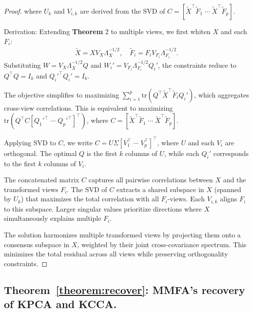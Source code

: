 \begin{proof}


where \( U_k \) and \( V_{i,k} \) are derived from the SVD of \( C = [\tilde{X}^\top \tilde{F}_1 \; \cdots \; \tilde{X}^\top \tilde{F}_p] \).

Derivation:  
Extending \textbf{Theorem} 2 to multiple views, we first whiten \( X \) and each \( F_i \):  
\begin{equation}
\begin{aligned}
\tilde{X} = X V_X\Lambda_X^{-1/2}, \quad \tilde{F}_i = F_i V_{F_i}\Lambda_{F_i}^{-1/2}.
\end{aligned}
\end{equation} 
Substituting \( W = V_X\Lambda_X^{-1/2} Q \) and \( W_i' = V_{F_i}\Lambda_{F_i}^{-1/2} Q_i' \), the constraints reduce to \( Q^\top Q = I_k \) and \( Q_i'^\top Q_i' = I_k \).  

The objective simplifies to maximizing \( \sum_{i=1}^p \text{tr}(Q^\top \tilde{X}^\top \tilde{F}_i Q_i') \), which aggregates cross-view correlations. This is equivalent to maximizing \( \text{tr}(Q^\top C [Q_1'^\top \; \cdots \; Q_p'^\top]^\top) \), where \( C = [\tilde{X}^\top \tilde{F}_1 \; \cdots \; \tilde{X}^\top \tilde{F}_p] \).  

Applying SVD to \( C \), we write \( C = U \Sigma [V_1^\top \; \cdots \; V_p^\top]^\top \), where \( U \) and each \( V_i \) are orthogonal. The optimal \( Q \) is the first \( k \) columns of \( U \), while each \( Q_i' \) corresponds to the first \( k \) columns of \( V_i \).  


The concatenated matrix \( C \) captures all pairwise correlations between \( X \) and the transformed views \( F_i \). The SVD of \( C \) extracts a shared subspace in \( X \) (spanned by \( U_k \)) that maximizes the total correlation with all \( F_i \)-views. Each \( V_{i,k} \) aligns \( F_i \) to this subspace. Larger singular values prioritize directions where \( X \) simultaneously explains multiple \( F_i \).  

The solution harmonizes multiple transformed views by projecting them onto a consensus subspace in \( X \), weighted by their joint cross-covariance spectrum. This minimizes the total residual across all views while preserving orthogonality constraints.  


\end{proof}

\subsection{Theorem~\ref{theorem:recover}: MMFA's recovery of KPCA and KCCA.}\label{sec:recoverk}

